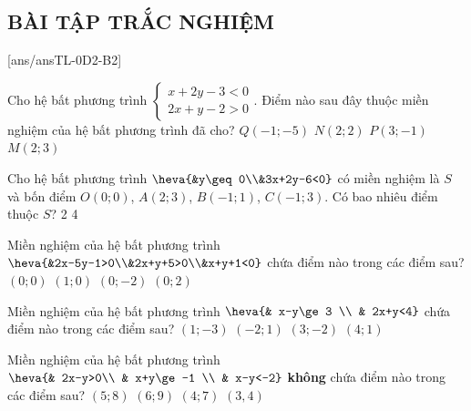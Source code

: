 \subsection{BÀI TẬP TRẮC NGHIỆM}
[ans/ansTL-0D2-B2]
\setcounter{ex}{0}
\begin{ex}%
	Cho hệ bất phương trình $\begin{cases}
			x+2y-3<0 \\
			2x+y-2>0
		\end{cases}$. Điểm nào sau đây thuộc miền nghiệm của hệ bất phương trình đã cho?
	\choice
	{$Q(-1;-5)$}
	{$N(2;2) $}
	{\True$P(3;-1) $}
	{$M(2;3)$}
\end{ex}

\begin{ex}%
	Cho hệ bất phương trình $\heva{&y\geq0\\&3x+2y-6<0}$ có miền nghiệm là $S$ và bốn điểm $O(0;0)$, $A(2;3)$, $B(-1;1)$, $C(-1;3)$. Có bao nhiêu điểm thuộc $S$?
	{2}
	{}
	{4}
\end{ex}

\begin{ex}%
	Miền nghiệm của hệ bất phương trình $\heva{&2x-5y-1>0\\&2x+y+5>0\\&x+y+1<0}$ chứa điểm nào trong các điểm sau?
	\choice
	{$(0;0)$}
	{$(1;0)$}
	{\True $(0;-2)$}
	{$(0;2)$}
\end{ex}

\begin{ex}%
	Miền nghiệm của hệ bất phương trình $\heva{& x-y\ge 3 \\ & 2x+y<4}$ chứa điểm nào trong các điểm sau?
	\choice
	{\True $(1;-3)$}
	{$(-2;1)$}
	{$(3;-2)$}
	{$(4;1)$}
\end{ex}

\begin{ex}%
	Miền nghiệm của hệ bất phương trình $\heva{& 2x-y>0\\ & x+y\ge -1 \\ & x-y<-2}$ \textbf{không} chứa điểm nào trong các điểm sau?
	\choice
	{$(5;8)$}
	{$(6;9)$}
	{$(4;7)$}
	{\True $(3,4)$}
\end{ex}

